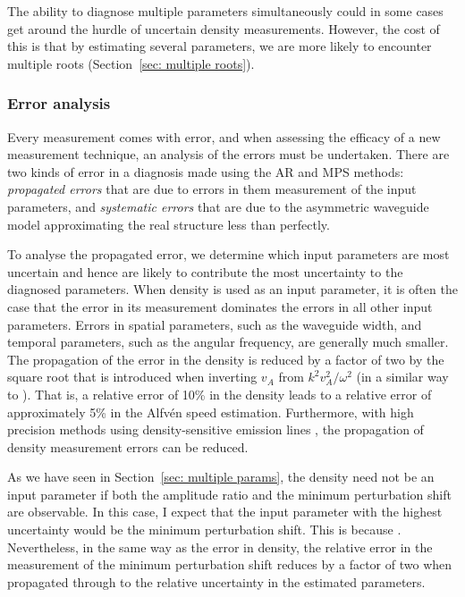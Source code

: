 \documentclass[12pt]{../style-files/ociamthesis}
\begin{document}
The ability to diagnose multiple parameters simultaneously could in some cases get around the hurdle of uncertain density measurements. However, the cost of this is that by estimating several parameters, we are more likely to encounter multiple roots (Section~\ref{sec: multiple roots}).


\subsubsection{Error analysis}

Every measurement comes with error, and when assessing the efficacy of a new measurement technique, an analysis of the errors must be undertaken. There are two kinds of error in a diagnosis made using the AR and MPS methods: \textit{propagated errors} that are due to errors in them measurement of the input parameters, and \textit{systematic errors} that are due to the asymmetric waveguide model approximating the real structure less than perfectly.

To analyse the propagated error, we determine which input parameters are most uncertain and hence are likely to contribute the most uncertainty to the diagnosed parameters. When density is used as an input parameter, it is often the case that the error in its measurement dominates the errors in all other input parameters. Errors in spatial parameters, such as the waveguide width, and temporal parameters, such as the angular frequency, are generally much smaller. The propagation of the error in the density is reduced by a factor of two by the square root that is introduced when inverting $v_A$ from $k^2v_A^2/\omega^2$ (in a similar way to \citealp{nak_etal01}). That is, a relative error of 10\% in the density leads to a relative error of approximately 5\% in the Alfv\'{e}n speed estimation. Furthermore, with high precision methods using density-sensitive emission lines \citep{you_etal09}, the propagation of density measurement errors can be reduced.

As we have seen in Section~\ref{sec: multiple params}, the density need not be an input parameter if both the amplitude ratio and the minimum perturbation shift are observable. In this case, I expect that the input parameter with the highest uncertainty would be the minimum perturbation shift. This is because . Nevertheless, in the same way as the error in density, the relative error in the measurement of the minimum perturbation shift reduces by a factor of two when propagated through to the relative uncertainty in the estimated parameters.
\end{document}
